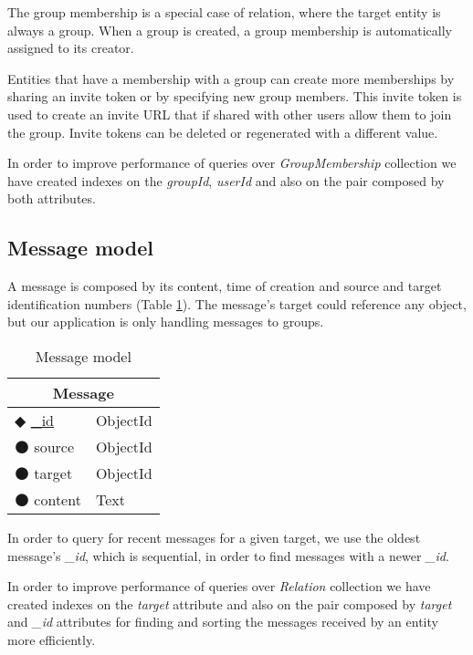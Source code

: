 The group membership is a special case of relation, where the target entity is always a group.
When a group is created, a group membership is automatically assigned to its creator.

Entities that have a membership with a group can create more memberships by sharing an invite token or by specifying new group members. This invite token is used to create an invite \ac{URL} that if shared with other users allow them to join the group. Invite tokens can be deleted or regenerated with a different value.

In order to improve performance of queries over \emph{GroupMembership} collection we have created indexes on the \emph{groupId}, \emph{userId} and also on the pair composed by both attributes.


\subsection{Message model}

A message is composed by its content, time of creation and source and target identification numbers (Table \ref{table:message}). The message's target could reference any object, but our application is only handling messages to groups.

\begin{table}[!htb]
\centering
\caption{Message model}
\label{table:message}
    \begin{tabular}{|ll|}
        \hline
        \multicolumn{2}{|c|}{\textbf{Message}}      \\ \hline
        $\Diamondblack$ \underline{\_id}  & ObjectId  \\ 
        $\medbullet$ source           & ObjectId    \\ 
        $\medbullet$ target      & ObjectId         \\ 
        $\medbullet$ content      & Text            \\ \hline
    \end{tabular}
\end{table}

In order to query for recent messages for a given target, we use the oldest message's \emph{\_id}, which is sequential, in order to find messages with a newer \emph{\_id}.

In order to improve performance of queries over \emph{Relation} collection we have created indexes on the \emph{target} attribute and also on the pair composed by \emph{target} and \emph{\_id} attributes for finding and sorting the messages received by an entity more efficiently. 

